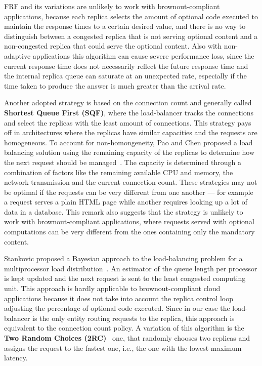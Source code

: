 FRF and its variations are unlikely to work with brownout-compliant
applications, because each replica selects the amount of optional code
executed to maintain the response times to a certain desired value,
and there is no way to distinguish between a congested replica that is
not serving optional content and a non-congested replica that could
serve the optional content. Also with non-adaptive applications this
algorithm can cause severe performance loss, since the current
response time does not necessarily reflect the future response time
and the internal replica queue can saturate at an unexpected rate,
especially if the time taken to produce the answer is much greater
than the arrival rate.

Another adopted strategy is based on the connection count and
generally called \textbf{Shortest Queue First (SQF)}, where the
load-balancer tracks the connections and select the replicas with the
least amount of connections. This strategy pays off in architectures
where the replicas have similar capacities and the requests are
homogeneous. To account for non-homongeneity, Pao and Chen proposed a
load balancing solution using the remaining capacity of the replicas
to determine how the next request should be
managed~\cite{feedbackintensive}. The capacity is determined through a
combination of factors like the remaining available CPU and memory,
the network transmission and the current connection count.  These
strategies may not be optimal if the requests can be very different
from one another --- for example a request serves a plain HTML page
while another requires looking up a lot of data in a database. This
remark also suggests that the strategy is unlikely to work with
brownout-compliant applications, where requests served with optional
computations can be very different from the ones containing only the
mandatory content.

Stankovic proposed a Bayesian approach to the load-balancing problem
for a multiprocessor load distribution~\cite{Stankovic:TC}. An
estimator of the queue length per processor is kept updated and the
next request is sent to the least congested computing unit. This
approach is hardly applicable to brownout-compliant cloud applications
because it does not take into account the replica control loop
adjusting the percentage of optional code executed. Since in our case
the load-balancer is the only entity routing requests to the replica,
this approach is equivalent to the connection count policy. A
variation of this algorithm is the \textbf{Two Random Choices
  (2RC)}~\cite{2RC} one, that randomly chooses two replicas and
assigns the request to the fastest one, i.e., the one with the
lowest maximum latency.

